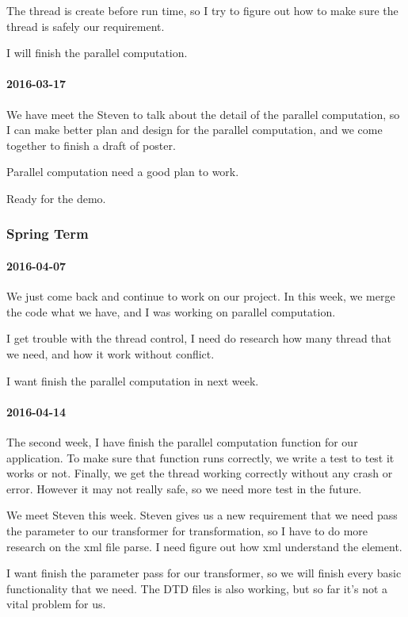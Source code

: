 The thread is create before run time, so I try to figure out how to make sure the thread is safely our requirement.


I will finish the parallel computation.

\paragraph{2016-03-17}
We have meet the Steven to talk about the detail of the parallel computation, so I can make better plan and design for the parallel computation, and we come together to finish a draft of poster.


Parallel computation need a good plan to work.


Ready for the demo.

\subsubsection{Spring Term}

\paragraph{2016-04-07}
We just come back and continue to work on our project. In this week, we merge the code what we have, and I was working on parallel computation.


I get trouble with the thread control, I need do research how many thread that we need, and how it work without conflict.


I want finish the parallel computation in next week.

\paragraph{2016-04-14}
The second week, I have finish the parallel computation function for our application. To make sure that function runs correctly, we write a test to test it works or not. Finally, we get the thread working correctly without any crash or error. However it may not really safe, so we need more test in the future.


We meet Steven this week. Steven gives us a new requirement that we need pass the parameter to our transformer for transformation, so I have to do more research on the xml file parse. I need figure out how xml understand the element.


I want finish the parameter pass for our transformer, so we will finish every basic functionality that we need. The DTD files is also working, but so far it's not a vital problem for us.

